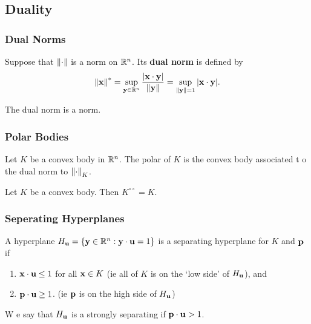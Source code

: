 \subsection{Duality}

\subsubsection{Dual Norms}
\begin{definition}
    Suppose that \(\norm{\cdot}\) is a norm on \(\mathbb{R}^n\). Its \textbf{dual norm} is defined by
    \[\norm{\bf x}^* = \sup_{{\bf y} \in \mathbb{R}^n} \frac{|\bf x \cdot y|}{\norm{\bf y}} = \sup_{\norm{\bf y} = 1} |{\bf x \cdot y}|.\]
\end{definition}

\begin{theorem}
    The dual norm is a norm.
\end{theorem}

\subsubsection{Polar Bodies}
\begin{definition}
    Let \(K\) be a convex body in \(\mathbb{R}^n\). The polar of \(K\) is the convex body associated t o the dual norm to \(\norm{\cdot}_K\).
\end{definition}

\begin{theorem}
    Let \(K\) be a convex body. Then \(K^{\circ \circ} = K\).
\end{theorem}

\subsubsection{Seperating Hyperplanes}
\begin{definition}
    A hyperplane \(H_{\bf u} = \{{\bf y} \in \mathbb{R}^n : {\bf y \cdot u} = 1 \}\) is a separating hyperplane for \(K\) and \(\bf p\) if
    \begin{enumerate}
        \item \({\bf x \cdot u} \leq 1\) for all \(\mathbf{x} \in K\) (ie all of \(K\) is on the `low side' of \(H_{\bf u}\)), and
        \item \({\bf p \cdot u } \geq 1\). (ie \({\bf p}\) is on the high side of \(H_{\bf u}\))
    \end{enumerate}
    W e say that \(H_{\bf u}\) is a strongly separating if \({\bf p \cdot u} > 1\).
\end{definition}

